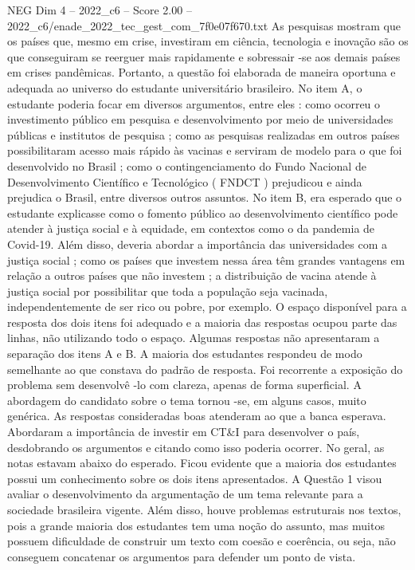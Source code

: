 \begin{textsample}{NEG Dim 4 – 2022\_c6 – Score 2.00 – 2022\_c6/enade\_2022\_tec\_gest\_com\_7f0e07f670.txt}
As pesquisas mostram que os países que, mesmo em crise, investiram em ciência, tecnologia e inovação são os que conseguiram se reerguer mais rapidamente e sobressair -se aos demais países em crises pandêmicas.
Portanto, a questão foi elaborada de maneira oportuna e adequada ao universo do estudante universitário brasileiro.
No item A, o estudante poderia focar em diversos argumentos, entre eles : como ocorreu o investimento público em pesquisa e desenvolvimento por meio de universidades públicas e institutos de pesquisa ; como as pesquisas realizadas em outros países possibilitaram acesso mais rápido às vacinas e serviram de modelo para o que foi desenvolvido no Brasil ; como o contingenciamento do Fundo Nacional de Desenvolvimento Científico e Tecnológico ( FNDCT ) prejudicou e ainda prejudica o Brasil, entre diversos outros assuntos.
No item B, era esperado que o estudante explicasse como o fomento público ao desenvolvimento científico pode atender à justiça social e à equidade, em contextos como o da pandemia de Covid-19.
Além disso, deveria abordar a importância das universidades com a justiça social ; como os países que investem nessa área têm grandes vantagens em relação a outros países que não investem ; a distribuição de vacina atende à justiça social por possibilitar que toda a população seja vacinada, independentemente de ser rico ou pobre, por exemplo.
O espaço disponível para a resposta dos dois itens foi adequado e a maioria das respostas ocupou parte das linhas, não utilizando todo o espaço.
Algumas respostas não apresentaram a separação dos itens A e B.
A maioria dos estudantes respondeu de modo semelhante ao que constava do padrão de resposta.
Foi recorrente a exposição do problema sem desenvolvê -lo com clareza, apenas de forma superficial.
A abordagem do candidato sobre o tema tornou -se, em alguns casos, muito genérica.
As respostas consideradas boas atenderam ao que a banca esperava.
Abordaram a importância de investir em CT\&I para desenvolver o país, desdobrando os argumentos e citando como isso poderia ocorrer.
No geral, as notas estavam abaixo do esperado.
Ficou evidente que a maioria dos estudantes possui um conhecimento sobre os dois itens apresentados.
A Questão 1 visou avaliar o desenvolvimento da argumentação de um tema relevante para a sociedade brasileira vigente.
Além disso, houve problemas estruturais nos textos, pois a grande maioria dos estudantes tem uma noção do assunto, mas muitos possuem dificuldade de construir um texto com coesão e coerência, ou seja, não conseguem concatenar os argumentos para defender um ponto de vista.

\end{textsample}
